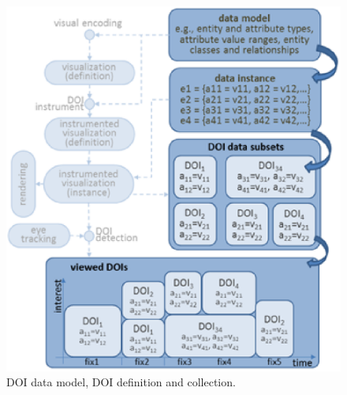 \begin{figure}[!htb]
  \centering
  \includegraphics[width=\linewidth]{images/DOIDataModel.eps}
  \caption{DOI data model, DOI definition and collection. }
	\label{fig:dataModel}
\end{figure}

